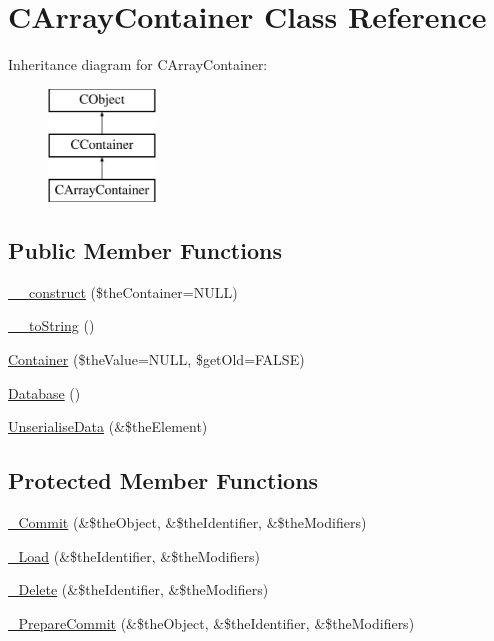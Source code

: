 \hypertarget{class_c_array_container}{\section{C\-Array\-Container Class Reference}
\label{class_c_array_container}
}
Inheritance diagram for C\-Array\-Container\-:\begin{figure}[H]
\begin{center}
\leavevmode
\includegraphics[height=3.000000cm]{class_c_array_container}
\end{center}
\end{figure}
\subsection*{Public Member Functions}
\begin{DoxyCompactItemize}
\item 
\hyperlink{class_c_array_container_a10e83176c2a2ee0d9fe53ca9e51b0ca0}{\-\_\-\-\_\-construct} (\$the\-Container=N\-U\-L\-L)
\item 
\hyperlink{class_c_array_container_aa7739e1def0a13a6750d6fa722952bcc}{\-\_\-\-\_\-to\-String} ()
\item 
\hyperlink{class_c_array_container_ac63eeb55a8c374668c5c443fb6e27df3}{Container} (\$the\-Value=N\-U\-L\-L, \$get\-Old=F\-A\-L\-S\-E)
\item 
\hyperlink{class_c_array_container_a2f9d4c3085fd60c39e41b6b8633b145b}{Database} ()
\item 
\hyperlink{class_c_array_container_af7892ddf82b819514d94cdf6b6e1b491}{Unserialise\-Data} (\&\$the\-Element)
\end{DoxyCompactItemize}
\subsection*{Protected Member Functions}
\begin{DoxyCompactItemize}
\item 
\hyperlink{class_c_array_container_a8f58eaea0751d43e4ac7a5d4c732ddaa}{\-\_\-\-Commit} (\&\$the\-Object, \&\$the\-Identifier, \&\$the\-Modifiers)
\item 
\hyperlink{class_c_array_container_a5dbd087347ec5fec6c3c62078da7ddea}{\-\_\-\-Load} (\&\$the\-Identifier, \&\$the\-Modifiers)
\item 
\hyperlink{class_c_array_container_ac8469e57be785cd45142fdaf0419bf8f}{\-\_\-\-Delete} (\&\$the\-Identifier, \&\$the\-Modifiers)
\item 
\hyperlink{class_c_array_container_ad77352799ccd0807013a133ccf5fd2bc}{\-\_\-\-Prepare\-Commit} (\&\$the\-Object, \&\$the\-Identifier, \&\$the\-Modifiers)
\end{DoxyCompactItemize}
